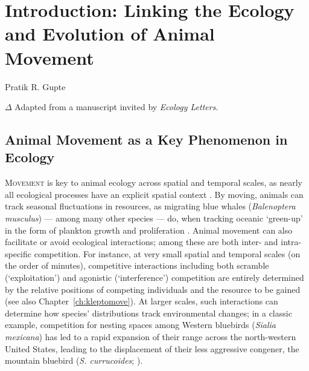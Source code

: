 
{}%
\chapter{Introduction: Linking the Ecology and Evolution of Animal Movement}\label{ch:introduction}

{{Pratik R. Gupte}}

\medskip

{\noindent \large{$\Delta$}} Adapted from a manuscript invited by \textit{Ecology Letters}.

\medskip


\section*{Animal Movement as a Key Phenomenon in Ecology}

\lettrine{M}{ovement} is key to animal ecology across spatial and temporal scales, as nearly all ecological processes have an explicit spatial context \citep{nathan2008a}.
By moving, animals can track seasonal fluctuations in resources, as migrating blue whales (\emph{Balenoptera musculus}) --- among many other species --- do, when tracking oceanic `green-up' in the form of plankton growth and proliferation \parencite{abrahms2021a,abrahms2019}.
Animal movement can also facilitate or avoid ecological interactions; among these are both inter- and intra-specific competition.
For instance, at very small spatial and temporal scales (on the order of minutes), competitive interactions including both scramble (`exploitation') and agonistic (`interference') competition \parencite[][]{keddy2001,birch1957} are entirely determined by the relative positions of competing individuals and the resource to be gained (see also Chapter~\ref{ch:kleptomove}).
At larger scales, such interactions can determine how species' distributions track environmental changes; in a classic example, competition for nesting spaces among Western bluebirds (\emph{Sialia mexicana}) has led to a rapid expansion of their range across the north-western United States, leading to the displacement of their less aggressive congener, the mountain bluebird (\emph{S. currucoides}; \cite{duckworth2007}).

